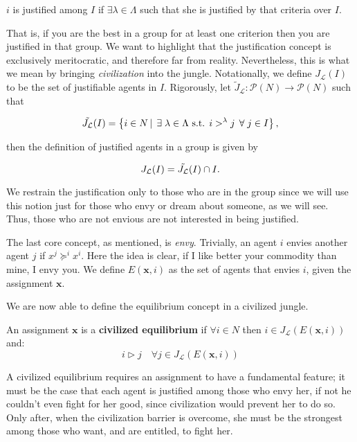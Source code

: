 \begin{center}
$i$ is justified among $I$ if $\exists\lambda\in\Lambda$ such that she is justified by that criteria over $I$.
\end{center}

That is, if you are the best in a group for at least one criterion then you are justified in that group. We want to highlight that the justification concept is exclusively meritocratic, and therefore far from reality. Nevertheless, this is what we mean by bringing \textit{civilization} into the jungle. 
Notationally, we define $J_{\mathcal{L}}(I)$ to be the set of justifiable agents in $I$. Rigorously, let $\tilde{J}_{\mathcal{L}}:\mathcal{P}(N)\rightarrow\mathcal{P}(N)$ such that

\[\Tilde{J_{\mathcal{L}}}(I)=\left\{i\in N\,|\, \exists\lambda\in\Lambda\text{ s.t. }i>^{\lambda}j\,\forall j\in I\right\},\]

then the definition of justified agents in a group is given by

\begin{equation}\label{eqn: J_L}
    J_{\mathcal{L}}(I)=\Tilde{J_{\mathcal{L}}}(I)\cap I.
\end{equation}

We restrain the justification only to those who are in the group since we will use this notion just for those who envy or dream about someone, as we will see. Thus, those who are not envious are not interested in being justified. 

The last core concept, as mentioned, is \textit{envy}. Trivially, an agent $i$ envies another agent $j$ if $x^j\succeq^ix^i$. Here the idea is clear, if I like better your commodity than mine, I envy you. We define $E(\textbf{x},i)$ as the set of agents that envies $i$, given the assignment $\textbf{x}$. 

We are now able to define the equilibrium concept in a civilized jungle.

\begin{definition}
    An assignment $\textbf{x}$ is a \textbf{civilized equilibrium} if $\forall i\in N$ then $i\in J_{\mathcal{L}}(E(\textbf{x},i))$ and:
    \[i\triangleright j \quad \forall j\in J_{\mathcal{L}}(E(\textbf{x},i)) \]
\end{definition}

A civilized equilibrium requires an assignment to have a fundamental feature; it must be the case that each agent is justified among those who envy her, if not he couldn't even fight for her good, since civilization would prevent her to do so. Only after, when the civilization barrier is overcome, she must be the strongest among those who want, and are entitled, to fight her.  

